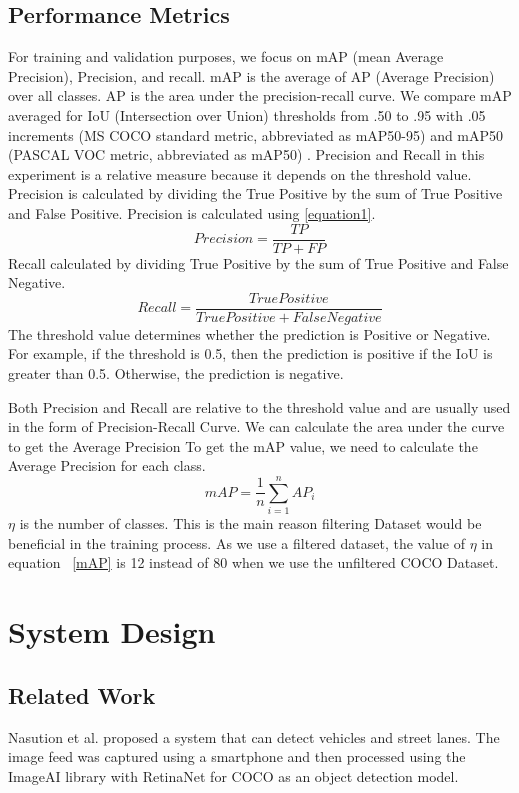 \documentclass[conference]{IEEEtran}
\begin{document}
\subsection{Performance Metrics}
For training and validation purposes, we focus on mAP (mean Average Precision), Precision, and recall. mAP is the average of AP (Average Precision) over all classes. AP is the area under the precision-recall curve.
We compare mAP averaged for IoU (Intersection over Union) thresholds from .50 to .95 with .05 increments (MS COCO standard metric, abbreviated as mAP50-95) and mAP50 (PASCAL VOC metric, abbreviated as mAP50) \cite{COCO Dataset}. 
Precision and Recall in  this experiment is a relative measure because it depends on the threshold value.
Precision is calculated by dividing the True Positive by the sum of True Positive and False Positive. 
Precision is calculated using \eqref{equation1}.
\begin{equation}
Precision = \frac{TP}{TP+FP}
\label{equation1}
\end{equation}
Recall calculated by dividing True Positive by the sum of True Positive and False Negative.
\begin{equation}
Recall = \frac{True Positive}{TruePositive+FalseNegative}
\end{equation}
The threshold value determines whether the prediction is Positive or Negative. For example, if the threshold is 0.5, then the prediction is positive if the IoU is greater than 0.5. Otherwise, the prediction is negative.

Both Precision and Recall are relative to the threshold value and are usually used in the form of Precision-Recall Curve. We can calculate the area under the curve to get the Average Precision
To get the mAP value, we need to calculate the Average Precision for each class.
\begin{equation}
mAP = \frac{1}{n}\sum_{i=1}^{n}AP_i
\label{mAP}
\end{equation}
$\eta$ is the number of classes.
This is the main reason filtering Dataset would be beneficial in the training process. As we use a filtered dataset, the value of $\eta$ in equation ~\ref{mAP} is 12 instead of 80 when we use the unfiltered COCO Dataset.


\section{System Design}
\subsection{Related Work}
Nasution et al.\cite{nasution2020road} proposed a system that can detect vehicles and street lanes. The image feed was captured using a smartphone and then processed using the ImageAI library with RetinaNet for COCO as an object detection model.
\end{document}
